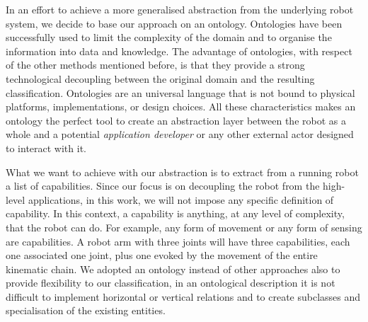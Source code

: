 In an effort to achieve a more generalised abstraction from the underlying robot system, we decide to base our approach on an ontology. Ontologies have been successfully used to limit the complexity of the domain and to organise the information into data and knowledge. The advantage of ontologies, with respect of the other methods mentioned before, is that they provide a strong technological decoupling between the original domain and the resulting classification. Ontologies are an universal language that is not bound to physical platforms, implementations, or design choices. All these characteristics makes an ontology the perfect tool to create an abstraction layer between the robot as a whole and a potential \textit{application developer} or any other external actor designed to interact with it. 

What we want to achieve with our abstraction is to extract from a running robot a list of capabilities. Since our focus is on decoupling the robot from the high-level applications, in this work, we will not impose any specific definition of capability. In this context, a capability is anything, at any level of complexity, that the robot can do. For example, any form of movement or any form of sensing are capabilities. A robot arm with three joints will have three capabilities, each one associated one joint, plus one evoked by the movement of the entire kinematic chain. We adopted an ontology instead of other approaches also to provide flexibility to our classification, in an ontological description it is not difficult to implement horizontal or vertical relations and to create subclasses and specialisation of the existing entities. 

